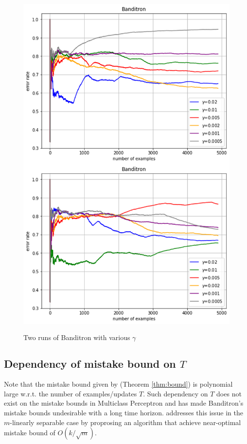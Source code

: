 \documentclass{article}
\begin{document}
\begin{figure}[t]
    \centering
    \includegraphics[width=0.7\linewidth]{./images/gammas.png}
    \label{fig:gammas}
    \caption{Two runs of Banditron with various $\gamma$}
\end{figure}

\subsection{Dependency of mistake bound on $T$}
Note that the mistake bound given by \citet{kakade2008efficient} (Theorem \ref{thm:bound}) is polynomial large w.r.t. the number of examples/updates $T$. Such dependency on $T$ does not exist on the mistake bounds in Multiclass Perceptron and has made Banditron's mistake bounds undesirable with a long time horizon. \citet{beygelzimer2019bandit} addresses this issue in the $m$-linearly separable case by proprosing an algorithm that achieve near-optimal mistake bound of $O(k/\sqrt{m})$.
\end{document}
